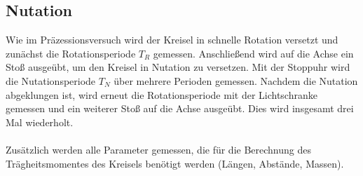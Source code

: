 \subsection{Nutation}
Wie im Präzessionsversuch wird der Kreisel in schnelle Rotation versetzt und zunächst die Rotationsperiode $T_R$ gemessen. Anschließend wird auf die Achse ein Stoß ausgeübt, um den Kreisel in Nutation zu versetzen. Mit der Stoppuhr wird die Nutationsperiode $T_N$ über mehrere Perioden gemessen. Nachdem die Nutation abgeklungen ist, wird erneut die Rotationsperiode mit der Lichtschranke gemessen und ein weiterer Stoß auf die Achse ausgeübt. Dies wird insgesamt drei Mal wiederholt.\\
\\
Zusätzlich werden alle Parameter gemessen, die für die Berechnung des Trägheitsmomentes des Kreisels benötigt werden (Längen, Abstände, Massen).